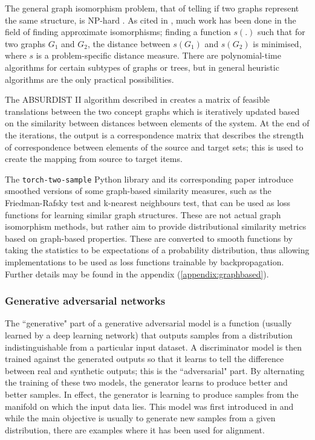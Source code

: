 The general graph isomorphism problem, that of telling if two graphs represent the same structure, is NP-hard \cite{GraphIsomorphismNPHard}. As cited in \cite{Absurdist2}, much work has been done in the field of finding approximate isomorphisms; finding a function $s(.)$ such that for two graphs $G_1$ and $G_2$, the distance between $s(G_1)$ and $s(G_2)$ is minimised, where $s$ is a problem-specific distance measure. There are polynomial-time algorithms for certain subtypes of graphs or trees, but in general heuristic algorithms are the only practical possibilities. 

The ABSURDIST II algorithm described in \cite{Absurdist2} creates a matrix of feasible translations between the two concept graphs which is iteratively updated based on the similarity between distances between elements of the system. At the end of the iterations, the output is a correspondence matrix that describes the strength of correspondence between elements of the source and target sets; this is used to create the mapping from source to target items. 

The \texttt{torch-two-sample} Python library and its corresponding paper \cite{torchtwosample} introduce smoothed versions of some graph-based similarity measures, such as the Friedman-Rafsky test and k-nearest neighbours test, that can be used as loss functions for learning similar graph structures. These are not actual graph isomorphism methods, but rather aim to provide distributional similarity metrics based on graph-based properties. These are converted to smooth functions by taking the statistics to be expectations of a probability distribution, thus allowing implementations to be used as loss functions trainable by backpropagation. Further details may be found in the appendix (\ref{appendix:graphbased}). 

\subsubsection{Generative adversarial networks}

The ``generative" part of a generative adversarial model is a function (usually learned by a deep learning network) that outputs samples from a distribution indistinguishable from a particular input dataset. A discriminator model is then trained against the generated outputs so that it learns to tell the difference between real and synthetic outputs; this is the ``adversarial" part. By alternating the training of these two models, the generator learns to produce better and better samples. In effect, the generator is learning to produce samples from the manifold on which the input data lies. This model was first introduced in \cite{GAN} and while the main objective is usually to generate new samples from a given distribution, there are examples where it has been used for alignment.

